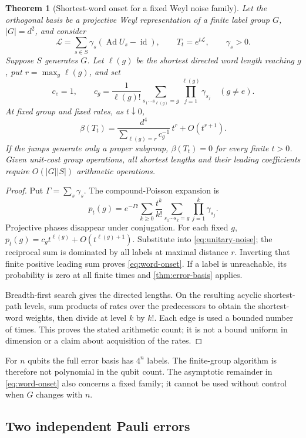 \documentclass[11pt]{article}
\numberwithin{equation}{section}
\newtheorem{theorem}{Theorem}[section]
\theoremstyle{definition}
\theoremstyle{remark}
\DeclareMathOperator{\id}{id}
\DeclareMathOperator{\Ad}{Ad}
\begin{document}
\begin{theorem}[Shortest-word onset for a fixed Weyl noise family]
\label{thm:word-onset}
Let the orthogonal basis be a projective Weyl representation of a
finite label group $G$, $|G|=d^2$, and consider
\[
 \mathcal L=\sum_{s\in S}\gamma_s(\Ad U_s-\id),\qquad
 T_t=e^{t\mathcal L},\qquad \gamma_s>0.
\]
Suppose $S$ generates $G$. Let $\ell(g)$ be the shortest directed
word length reaching $g$, put $r=\max_g\ell(g)$, and set
\[
 c_e=1,\qquad
 c_g=\frac1{\ell(g)!}
       \sum_{s_1\cdots s_{\ell(g)}=g}
                    \prod_{j=1}^{\ell(g)}\gamma_{s_j}\quad(g\ne e).
\]
At fixed group and fixed rates, as $t\downarrow0$,
\begin{equation}
 \beta(T_t)=
 \frac{d^4}{\sum_{\ell(g)=r}c_g^{-1}}\,t^r+O(t^{r+1}).
 \label{eq:word-onset}
\end{equation}
If the jumps generate only a proper subgroup, $\beta(T_t)=0$ for
every finite $t>0$. Given unit-cost group operations, all shortest
lengths and their leading coefficients require
$O(|G||S|)$ arithmetic operations.
\end{theorem}
\begin{proof}
Put $\Gamma=\sum_s\gamma_s$. The compound-Poisson expansion is
\[
 p_t(g)=e^{-\Gamma t}
 \sum_{k\geq0}\frac{t^k}{k!}
     \sum_{s_1\cdots s_k=g}\prod_{j=1}^k\gamma_{s_j}.
\]
Projective phases disappear under conjugation. For each fixed $g$,
$p_t(g)=c_gt^{\ell(g)}+O(t^{\ell(g)+1})$.
Substitute into \eqref{eq:unitary-noise}; the reciprocal sum is
dominated by all labels at maximal distance $r$. Inverting that
finite positive leading sum proves \eqref{eq:word-onset}.
If a label is unreachable, its probability is zero at all finite
times and \cref{thm:error-basis} applies.

Breadth-first search gives the directed lengths. On the resulting
acyclic shortest-path levels, sum products of rates over the
predecessors to obtain the shortest-word weights, then divide at
level $k$ by $k!$. Each edge is used a bounded number of times.
This proves the stated arithmetic count; it is not a bound uniform
in dimension or a claim about acquisition of the rates.
\end{proof}

For $n$ qubits the full error basis has $4^n$ labels. The finite-group
algorithm is therefore not polynomial in the qubit count. The asymptotic
remainder in \eqref{eq:word-onset} also concerns a fixed family; it
cannot be used without control when $G$ changes with $n$.

\subsection{Two independent Pauli errors}
\end{document}

